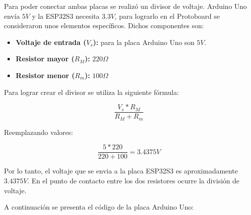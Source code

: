 Para poder conectar ambas placas se realizó un divisor de voltaje. Arduino Uno envía $5 V$ y la ESP32S3 necesita $3.3 V$, para lograrlo en el Protoboard se consideraron unos elementos específicos. Dichos componentes son:

\begin{itemize}
  \item \textbf{Voltaje de entrada ($V_s$):} para la placa Arduino Uno son $5 V$.
  \item \textbf{Resistor mayor ($R_M$):} $220 \Omega$
  \item \textbf{Resistor menor ($R_m$):} $100 \Omega$
\end{itemize}

Para lograr crear el divisor se utiliza la siguiente fórmula:

\[ \frac{V_s * R_M}{R_M + R_m} \]

Reemplazando valores:

\[ \frac{5 * 220}{220 + 100} = 3.4375 V \]

Por lo tanto, el voltaje que se envia a la placa ESP32S3 es aproximadamente $3.4375 V$. En el punto de contacto entre los dos resistores ocurre la división de voltaje.

A continuación se presenta el código de la placa Arduino Uno:

